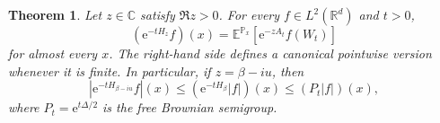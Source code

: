 \documentclass[11pt,reqno]{amsart}
\newtheorem{theorem}{Theorem}[section]
\theoremstyle{definition}
\numberwithin{equation}{section}
\newcommand{\<}{\langle}
\renewcommand{\>}{\rangle}
\def\prob{{\mathbb P}}
\begin{document}
\begin{appendix}
\begin{theorem}
\label{thm:complex-fk-app}
Let $z\in\mathbb C$ satisfy $\Re z>0$.  For every
$f\in L^2(\mathbb R^d)$ and $t>0$,
\begin{equation}
  (\mathrm e^{-tH_z}f)(x)
  =\mathbb E^{\prob_x}\left[
       \mathrm e^{-zA_t}f(W_t)
    \right]
  \label{eq:complex-fk-app}
\end{equation}
for almost every $x$.  The right-hand side defines a canonical pointwise
version whenever it is finite.  In particular, if $z=\beta-iu$, then
\begin{equation}
  |\mathrm e^{-tH_{\beta-iu}}f|(x)
  \leq (\mathrm e^{-tH_\beta}|f|)(x)
  \leq (P_t|f|)(x),
  \label{eq:complex-fk-domination-app}
\end{equation}
where $P_t=\mathrm e^{t\Delta/2}$ is the free Brownian semigroup.
\end{theorem}


\end{appendix}
\end{document}
